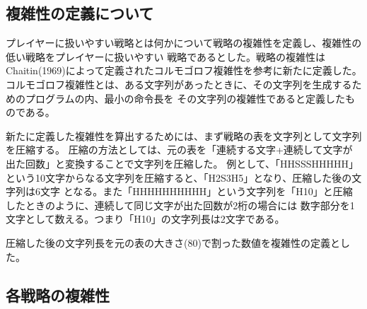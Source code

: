 \subsection{複雑性の定義について}

プレイヤーに扱いやすい戦略とは何かについて戦略の複雑性を定義し、複雑性の低い戦略をプレイヤーに扱いやすい
戦略であるとした。戦略の複雑性はChaitin(1969)によって定義されたコルモゴロフ複雑性を参考に新たに定義した。
コルモゴロフ複雑性とは、ある文字列があったときに、その文字列を生成するためのプログラムの内、最小の命令長を
その文字列の複雑性であると定義したものである。

新たに定義した複雑性を算出するためには、まず戦略の表を文字列として文字列を圧縮する。
圧縮の方法としては、元の表を「連続する文字+連続して文字が出た回数」と変換することで文字列を圧縮した。
例として、「HHSSSHHHHH」という10文字からなる文字列を圧縮すると、「H2S3H5」となり、圧縮した後の文字列は6文字
となる。また「HHHHHHHHHH」という文字列を「H10」と圧縮したときのように、連続して同じ文字が出た回数が2桁の場合には
数字部分を1文字として数える。つまり「H10」の文字列長は2文字である。

圧縮した後の文字列長を元の表の大きさ(80)で割った数値を複雑性の定義とした。

\subsection{各戦略の複雑性}


